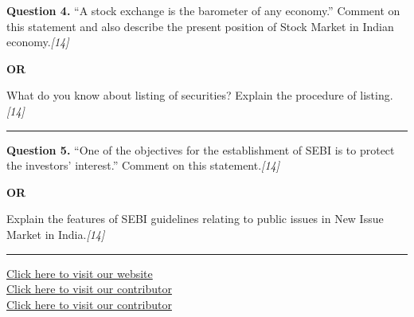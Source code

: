 \documentclass[11pt,a4paper]{article}
\newcommand{\pts}[1]{\hfill   \textit{[#1]}}
\begin{document}
\noindent   \textbf{Question 4.}
``A stock exchange is the barometer of any economy.'' Comment on this statement and also describe the present position of Stock Market in Indian economy.\pts{14}

\centerline{   \textbf{OR}}

What do you know about listing of securities? Explain the procedure of listing.\pts{14}

\medskip\rule{\linewidth}{0.2pt}




\noindent   \textbf{Question 5.}
``One of the objectives for the establishment of SEBI is to protect the investors' interest.'' Comment on this statement.\pts{14}

\centerline{   \textbf{OR}}

Explain the features of SEBI guidelines relating to public issues in New Issue Market in India.\pts{14}

\vfill
\rule{\linewidth}{0.4pt}

\begin{center}\small
\href{https://bhu-exam.vercel.app/}{Click here to visit our website}\\[4pt]
\href{https://me-aryan.vercel.app/}{Click here to visit our contributor}\\[4pt]
\href{https://quashan-me.vercel.app/}{Click here to visit our contributor}
\end{center}
\end{document}
